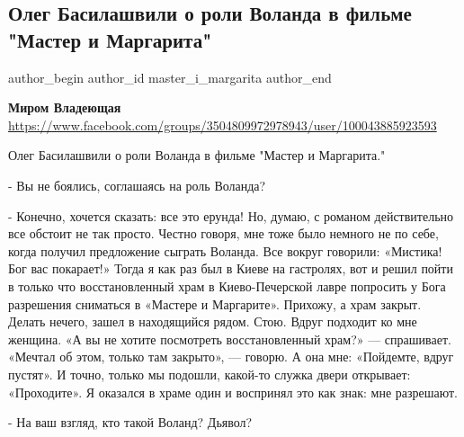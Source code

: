  
 
 
 
 
 
\subsection{Олег Басилашвили о роли Воланда в фильме  "Мастер и Маргарита"}
\label{sec:27_05_2021.fb.master_i_margarita.1.voland_film_basilashvili}
\ifcmt
 author_begin
   author_id master_i_margarita
 author_end
\fi

\textbf{Миром Владеющая}
\url{https://www.facebook.com/groups/3504809972978943/user/100043885923593}

Олег Басилашвили о роли Воланда в фильме  "Мастер и Маргарита."

-  Вы не боялись, соглашаясь на роль Воланда?

- Конечно, хочется сказать: все это ерунда! Но, думаю, с романом действительно
все обстоит не так просто. Честно говоря, мне тоже было немного не по себе,
когда получил предложение сыграть Воланда. Все вокруг говорили: «Мистика! Бог
вас покарает!» Тогда я как раз был в Киеве на гастролях, вот и решил пойти в
только что восстановленный храм в Киево-Печерской лавре попросить у Бога
разрешения сниматься в «Мастере и Маргарите». Прихожу, а храм закрыт. Делать
нечего, зашел в находящийся рядом. Стою. Вдруг подходит ко мне женщина. «А вы
не хотите посмотреть восстановленный храм?» — спрашивает. «Мечтал об этом,
только там закрыто», — говорю. А она мне: «Пойдемте, вдруг пустят». И точно,
только мы подошли, какой-то служка двери открывает: «Проходите». Я оказался в
храме один и воспринял это как знак: мне разрешают.

- На ваш взгляд, кто такой Воланд? Дьявол?

